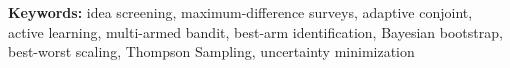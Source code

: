 \documentclass[a4paper,12pt]{article}
\begin{document}

\textbf{Keywords:}
{idea screening, maximum-difference surveys, adaptive conjoint, active learning, multi-armed bandit, best-arm identification, Bayesian bootstrap, best-worst scaling, Thompson Sampling, uncertainty minimization}







\end{document}
